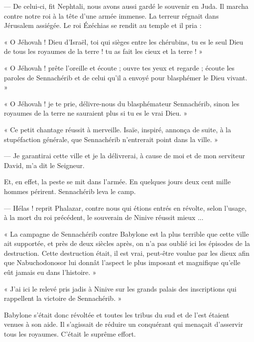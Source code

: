 \documentclass[a4paper, 11pt, oneside, polutonikogreek, french]{article}
\begin{document}
\bigskip
\centerline{\EightStarTaper}
\centerline{\EightStarTaper\EightStarTaper}
\bigskip

--- De celui-ci, fit Nephtali, nous avons aussi gardé le souvenir en Juda. Il marcha contre notre roi à la tête d'une armée immense. La terreur régnait dans Jérusalem assiégée. Le roi Ézéchias se rendit au temple et il pria :

« O Jéhovah ! Dieu d'Israël, toi qui sièges entre les chérubins, tu es le seul Dieu de tous les royaumes de la terre ! tu as fait les cieux et la terre ! »

« O Jéhovah ! prête l'oreille et écoute ; ouvre tes yeux et regarde ; écoute les paroles de Sennachérib et de celui qu'il a envoyé pour blasphémer le Dieu vivant. »

« O Jéhovah ! je te prie, délivre-nous du blasphémateur Sennachérib, sinon les royaumes de la terre ne sauraient plus si tu es le vrai Dieu. »

« Ce petit chantage réussit à merveille. Isaïe, inspiré, annonça de suite, à la stupéfaction générale, que Sennachérib n'entrerait point dans la ville. »

--- Je garantirai cette ville et je la délivrerai, à cause de moi et de mon serviteur David, m'a dit le Seigneur.

Et, en effet, la peste se mit dans l'armée. En quelques jours deux cent mille hommes périrent. Sennachérib leva le camp.

--- Hélas ! reprit Phalazar, contre nous qui étions entrés en révolte, selon l'usage, à la mort du roi précédent, le souverain de Ninive réussit mieux ...

\bigskip
\centerline{\EightStarTaper}
\centerline{\EightStarTaper\EightStarTaper}
\bigskip

« La campagne de Sennachérib contre Babylone est la plus terrible que cette ville ait supportée, et près de deux siècles après, on n'a pas oublié ici les épisodes de la destruction. Cette destruction était, il est vrai, peut-être voulue par les dieux afin que Nabuchodonosor lui donnât l'aspect le plus imposant et magnifique qu'elle eût jamais eu dans l'histoire. »

« J'ai ici le relevé pris jadis à Ninive sur les grands palais des inscriptions qui rappellent la victoire de Sennachérib. »

Babylone s'était donc révoltée et toutes les tribus du sud et de l'est étaient venues à son aide. Il s'agissait de réduire un conquérant qui menaçait d'asservir tous les royaumes. C'était le suprême effort.
\end{document}
